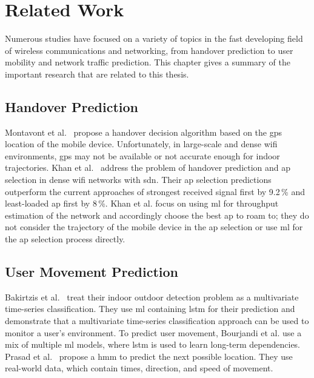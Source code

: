 \chapter{Related Work}\label{ch:related-work}

Numerous studies have focused on a variety of topics in the fast developing field of wireless communications and networking, from handover prediction to user mobility and network traffic prediction.
This chapter gives a summary of the important research that are related to this thesis.



\section{Handover Prediction}

Montavont et al.~\cite{handover-assisted-by-gps} propose a handover decision algorithm based on the \ac{gps} location of the mobile device.
Unfortunately, in large-scale and dense \ac{wifi} environments, \ac{gps} may not be available or not accurate enough for indoor trajectories.
Khan et al.~\cite{MLBasedHandoverPrediction2022} address the problem of handover prediction and \ac{ap} selection in dense \ac{wifi} networks with \ac{sdn}.
Their \ac{ap} selection predictions outperform the current approaches of strongest received signal first by 9.2\,\% and least-loaded \ac{ap} first by 8\,\%.
Khan et al. focus on using \ac{ml} for throughput estimation of the network and accordingly choose the best \ac{ap} to roam to; they do not consider the trajectory of the mobile device in the \ac{ap} selection or use \ac{ml} for the \ac{ap} selection process directly.

\section{User Movement Prediction}

Bakirtzis et al.~\cite{multivariate-lstm-indoor-outdoor} treat their indoor outdoor detection problem as a multivariate time-series classification.
They use \ac{ml} containing \ac{lstm} for their prediction and demonstrate that a multivariate time-series classification approach can be used to monitor a user's environment.
To predict user movement, Bourjandi et al. \cite{bourjandiPredictingUserMovement2022} use a mix of multiple \ac{ml} models, where \ac{lstm} is used to learn long-term dependencies.
Prasad et al.~\cite{hmm-movement-prediction} propose a \ac{hmm} to predict the next possible location.
They use real-world data, which contain times, direction, and speed of movement.

